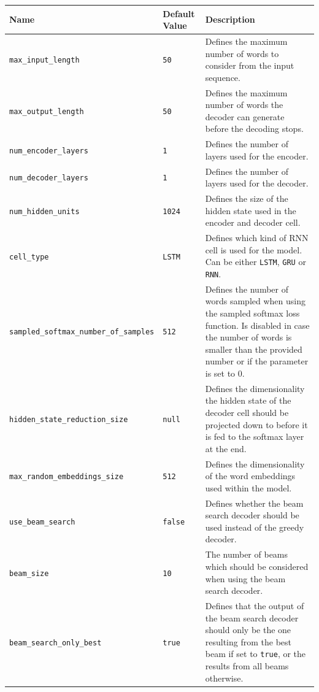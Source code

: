\begin{table}[H]
	\centering
	\begin{adjustbox}{max width=\textwidth, max height=\textheight}
		\begin{tabular}{llp{10cm}}
		\toprule
		Name & Default Value & Description\\ \midrule
		\texttt{max{\_}input\_length} & \texttt{50} & Defines the maximum number of words to consider from the input sequence.\\
		\texttt{max{\_}output\_length} & \texttt{50} & Defines the maximum number of words the decoder can generate before the decoding stops.\\
		\texttt{num{\_}encoder\_layers} & \texttt{1} & Defines the number of layers used for the encoder.\\
		\texttt{num{\_}decoder\_layers} & \texttt{1} & Defines the number of layers used for the decoder.\\
		\texttt{num{\_}hidden\_units} & \texttt{1024} & Defines the size of the hidden state used in the encoder and decoder cell.\\
		\texttt{cell{\_}type} & \texttt{LSTM} & Defines which kind of RNN cell is used for the model. Can be either \texttt{LSTM}, \texttt{GRU} or \texttt{RNN}.\\
		\texttt{sampled{\_}softmax\_number\_of\_samples} & \texttt{512} & Defines the number of words sampled when using the sampled softmax loss function. Is disabled in case the number of words is smaller than the provided number or if the parameter is set to 0.\\
		\texttt{hidden\_state\_reduction\_size} & \texttt{null} & Defines the dimensionality the hidden state of the decoder cell should be projected down to before it is fed to the softmax layer at the end.\\
		\texttt{max\_random\_embeddings\_size} & \texttt{512} & Defines the dimensionality of the word embeddings used within the model.\\
		\texttt{use\_beam\_search} & \texttt{false} & Defines whether the beam search decoder should be used instead of the greedy decoder.\\
		\texttt{beam\_size} & \texttt{10} & The number of beams which should be considered when using the beam search decoder.\\
		\texttt{beam\_search\_only\_best} & \texttt{true} & Defines that the output of the beam search decoder should only be the one resulting from the best beam if set to \texttt{true}, or the results from all beams otherwise.\\

\end{tabular}
\end{adjustbox}
\end{table}
